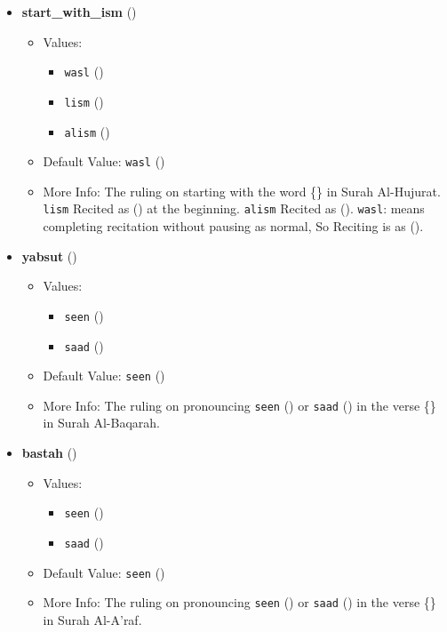 \begin{itemize}
\item \textbf{start\_with\_ism} ()
  \begin{itemize}
  \item Values: 
    \begin{itemize}
    \item  \texttt{wasl} ()
    \item  \texttt{lism} ()
    \item  \texttt{alism} ()
    \end{itemize}
  \item Default Value: \texttt{wasl} ()
  \item More Info: The ruling on starting with the word \{\} in Surah Al-Hujurat. \texttt{lism} Recited as () at the beginning. \texttt{alism} Recited as (). \texttt{wasl}: means completing recitation without pausing as normal, So Reciting is as ().
  \end{itemize}

\item \textbf{yabsut} ()
  \begin{itemize}
  \item Values: 
    \begin{itemize}
    \item  \texttt{seen} ()
    \item  \texttt{saad} ()
    \end{itemize}
  \item Default Value: \texttt{seen} ()
  \item More Info: The ruling on pronouncing \texttt{seen} () or \texttt{saad} () in the verse \{\} in Surah Al-Baqarah.
  \end{itemize}

\item \textbf{bastah} ()
  \begin{itemize}
  \item Values: 
    \begin{itemize}
    \item  \texttt{seen} ()
    \item  \texttt{saad} ()
    \end{itemize}
  \item Default Value: \texttt{seen} ()
  \item More Info: The ruling on pronouncing \texttt{seen} () or \texttt{saad} () in the verse \{\} in Surah Al-A'raf.
  \end{itemize}


\end{itemize}
